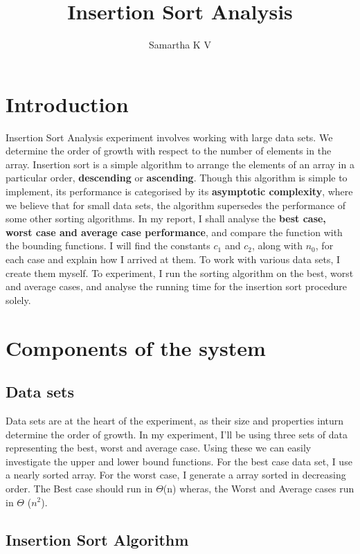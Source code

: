 \documentclass[a4paper]{article}
\title{Insertion Sort Analysis}
\author{Samartha K V}
\begin{document}
\maketitle



\section{Introduction}

Insertion Sort Analysis experiment involves working with large data sets. We determine the order of growth with respect to the number of elements in the array. Insertion sort is a simple algorithm to arrange the elements of an array in a particular order, \textbf{descending} or \textbf{ascending}. Though this algorithm is simple to implement, its performance is categorised by its \textbf{asymptotic complexity}, where we believe that for small data sets, the algorithm supersedes the performance of some other sorting algorithms. In my report, I shall analyse the\textbf{ best case, worst case and average case performance}, and compare the function with the bounding functions. I will find the constants $c_{1}$ and $c_{2}$, along with $n_{0}$, for each case and explain how I arrived at them. To work with various data sets, I create them myself. To experiment, I run the sorting algorithm on the best, worst and average cases, and analyse the running time for the insertion sort procedure solely.

\section{Components of the system }

\subsection{Data sets}

Data sets are at the heart of the experiment, as their size and properties inturn determine the order of growth. In my experiment, I'll be using three sets of data representing the best, worst and average case. Using these we can easily investigate the upper and lower bound functions. For the best case data set, I use a nearly sorted array. For the worst case, I generate a array sorted in decreasing order. The Best case should run in $\Theta$(n) wheras, the Worst and Average cases run in $\Theta$ ($n^{2}$). 
\subsection{Insertion Sort Algorithm}
\end{document}
